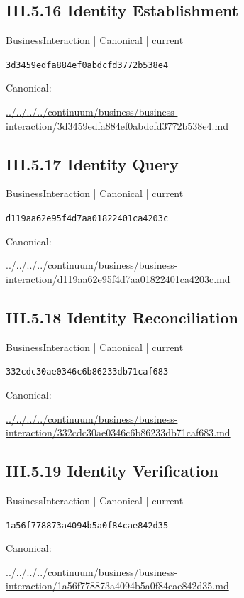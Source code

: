 \documentclass[10pt,a4paper]{article}
\begin{document}
\subsection*{III.5.16 Identity Establishment}
\label{element-3d3459edfa884ef0abdcfd3772b538e4}
{\small BusinessInteraction | Canonical | current}\par
\texttt{3d3459edfa884ef0abdcfd3772b538e4}\par
Canonical: \par
{\footnotesize\url{../../../../continuum/business/business-interaction/3d3459edfa884ef0abdcfd3772b538e4.md}}\par
\subsection*{III.5.17 Identity Query}
\label{element-d119aa62e95f4d7aa01822401ca4203c}
{\small BusinessInteraction | Canonical | current}\par
\texttt{d119aa62e95f4d7aa01822401ca4203c}\par
Canonical: \par
{\footnotesize\url{../../../../continuum/business/business-interaction/d119aa62e95f4d7aa01822401ca4203c.md}}\par
\subsection*{III.5.18 Identity Reconciliation}
\label{element-332cdc30ae0346c6b86233db71caf683}
{\small BusinessInteraction | Canonical | current}\par
\texttt{332cdc30ae0346c6b86233db71caf683}\par
Canonical: \par
{\footnotesize\url{../../../../continuum/business/business-interaction/332cdc30ae0346c6b86233db71caf683.md}}\par
\subsection*{III.5.19 Identity Verification}
\label{element-1a56f778873a4094b5a0f84cae842d35}
{\small BusinessInteraction | Canonical | current}\par
\texttt{1a56f778873a4094b5a0f84cae842d35}\par
Canonical: \par
{\footnotesize\url{../../../../continuum/business/business-interaction/1a56f778873a4094b5a0f84cae842d35.md}}\par
\end{document}
